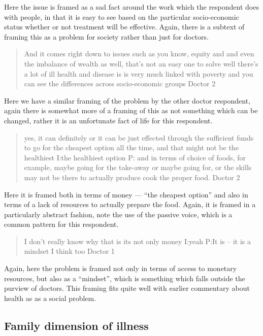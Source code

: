 Here the issue is framed as a sad fact around the work which the respondent does with people, in that it is easy to see based on the particular socio-economic status whether or not treatment will be effective. Again, there is a subtext of framing this as a problem for society rather than just for doctors. 

\begin{quotation}
  And it comes right down to issues such as you know, equity and and even the imbalance of wealth as well, that's not an easy one to solve well there's a lot of ill health and disease is is very much linked with poverty and you can see the differences across socio-economic groups 
Doctor 2
\end{quotation}

Here we have a similar framing of the problem by the other doctor respondent, again there is somewhat more of a framing of this as not something which can be changed, rather it is an unfortunate fact of life for this respondent. 

\begin{quotation}
  yes, it can definitely or it can be just effected through the sufficient funds to go for the cheapest option all the time, and that might not be the healthiest
I:the healthiest option
P: and in terms of choice of foods, for example, maybe going for the take-away or maybe going for, or the skills may not be there to actually produce cook the proper food.
Doctor 2
\end{quotation}

Here it is framed both in terms of money --- ``the cheapest option'' and also in terms of a lack of resources to actually prepare the food. Again, it is framed in a particularly abstract fashion, note the use of the passive voice, which is a common pattern for this respondent. 

\begin{quotation}
   I don't really know why that is its not only money 
I:yeah
P:It is – it is a mindset I think too
Doctor 1
\end{quotation}
 Again, here the problem is framed not only in terms of access to monetary resources, but also as a ``mindset'', which is something which falls outside the purview of doctors. This framing fits quite well with earlier commentary about health as as a social problem. 

\subsection{Family dimension of illness}
\label{sec:family-dimens-illn}

